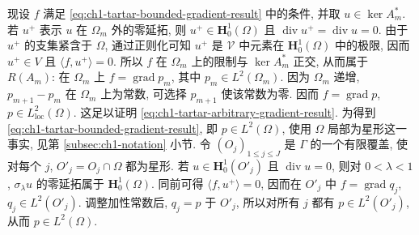 \begin{Remark}
现设 $f$ 满足 \eqref{eq:ch1-tartar-bounded-gradient-result} 中的条件, 并取 $u\in\ker A_m^*$. 若 $u^+$ 表示 $u$ 在 $\Omega_m$ 外的零延拓, 则 $u^+\in\mathbf H_0^1(\Omega)$ 且 $\operatorname{div}u^+=\operatorname{div}u=0$. 由于 $u^+$ 的支集紧含于 $\Omega$, 通过正则化可知 $u^+$ 是 $\mathcal V$ 中元素在 $\mathbf H_0^1(\Omega)$ 中的极限, 因而 $u^+\in V$ 且 $\langle f,u^+\rangle=0$. 所以 $f$ 在 $\Omega_m$ 上的限制与 $\ker A_m^*$ 正交, 从而属于 $R(A_m)$: 在 $\Omega_m$ 上 $f=\operatorname{grad}p_m$, 其中 $p_m\in L^2(\Omega_m)$. 因为 $\Omega_m$ 递增, $p_{m+1}-p_m$ 在 $\Omega_m$ 上为常数, 可选择 $p_{m+1}$ 使该常数为零. 因而 $f=\operatorname{grad}p$, $p\in L^2_{\mathrm{loc}}(\Omega)$.
这足以证明 \eqref{eq:ch1-tartar-arbitrary-gradient-result}. 为得到 \eqref{eq:ch1-tartar-bounded-gradient-result}, 即 $p\in L^2(\Omega)$, 使用 $\Omega$ 局部为星形这一事实, 见第 \ref{subsec:ch1-notation} 小节. 令 $(O_j)_{1\leq j\leq J}$ 是 $\Gamma$ 的一个有限覆盖, 使对每个 $j$, $O'_j=O_j\cap\Omega$ 都为星形. 若 $u\in\mathbf H_0^1(O'_j)$ 且 $\operatorname{div}u=0$, 则对 $0<\lambda<1$, $\sigma_\lambda u$ 的零延拓属于 $\mathbf H_0^1(\Omega)$. 同前可得 $\langle f,u^+\rangle=0$, 因而在 $O'_j$ 中 $f=\operatorname{grad}q_j$, $q_j\in L^2(O'_j)$. 调整加性常数后, $q_j=p$ 于 $O'_j$, 所以对所有 $j$ 都有 $p\in L^2(O'_j)$, 从而 $p\in L^2(\Omega)$.
\end{Remark}
